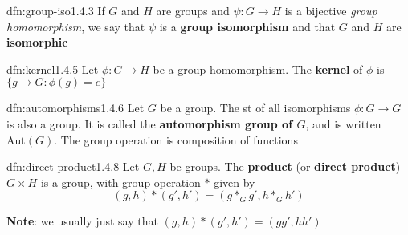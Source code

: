 \documentclass{article}
\begin{document}
\begin{dfn}{dfn:group-iso}{1.4.3}
    If $G$ and $H$ are groups and $\psi : G \to H$ is a bijective \textit{group homomorphism}, we say that $\psi$ is a \textbf{group isomorphism} and that $G$ and $H$ are \textbf{isomorphic}
\end{dfn}

\begin{dfn}{dfn:kernel}{1.4.5}
    Let $\phi : G \to H$ be a group homomorphism. The \textbf{kernel} of $\phi$ is $\{g \to G : \phi(g) = e\}$
\end{dfn}

\begin{dfn}[Automorphisms]{dfn:automorphisms}{1.4.6}
    Let $G$ be a group. The st of all isomorphisms $\phi : G \to G$ is also a group. It is called the \textbf{automorphism group of $G$}, and is written $\mathrm{Aut}(G)$. The group operation is composition of functions
\end{dfn}

\begin{dfn}{dfn:direct-product}{1.4.8}
    Let $G, H$ be groups. The \textbf{product} (or \textbf{direct product}) $G \times H$ is a group, with group operation $*$ given by
    \[(g, h) * (g', h') = (g *_{G} g', h *_{G} h')\]

    \textbf{Note}: we usually just say that $(g, h) * (g', h') = (gg', hh')$
\end{dfn}
\end{document}
